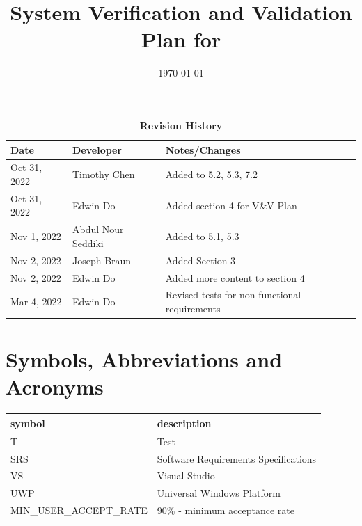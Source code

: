 \documentclass[12pt, titlepage]{article}
\begin{document}
\title{System Verification and Validation Plan for \progname{}} 
\author{\authname}
\date{\today}
	
\maketitle


\begin{table}[H]
  \caption{\bf Revision History}
  \begin{tabularx}{\textwidth}{p{2.5cm}p{2.5cm}X}
  \toprule {\bf Date} & {\bf Developer} & {\bf Notes/Changes}\\
  \midrule
  Oct 31, 2022 & Timothy Chen & Added to 5.2, 5.3, 7.2\\
  Oct 31, 2022 & Edwin Do & Added section 4 for V\&V Plan\\
  Nov 1, 2022 & Abdul Nour Seddiki & Added to 5.1, 5.3\\
  Nov 2, 2022 & Joseph Braun & Added Section 3\\
  Nov 2, 2022 & Edwin Do & Added more content to section 4 \\
  Mar 4, 2022 & Edwin Do & Revised tests for non functional requirements\\
  \bottomrule
  \end{tabularx}
  \end{table}
  

\newpage

\tableofcontents

\listoftables
{}

\listoffigures
{}

\newpage

\section{Symbols, Abbreviations and Acronyms}

\renewcommand{\arraystretch}{1.2}
\begin{tabular}{l l} 
  \toprule		
  \textbf{symbol} & \textbf{description}\\
  \midrule 
  T & Test\\
  SRS & Software Requirements Specifications \\
  VS & Visual Studio\\
  UWP & Universal Windows Platform\\
  MIN\_USER\_ACCEPT\_RATE & 90\% - minimum acceptance rate\\
  \bottomrule
\end{tabular}\\
\end{document}
